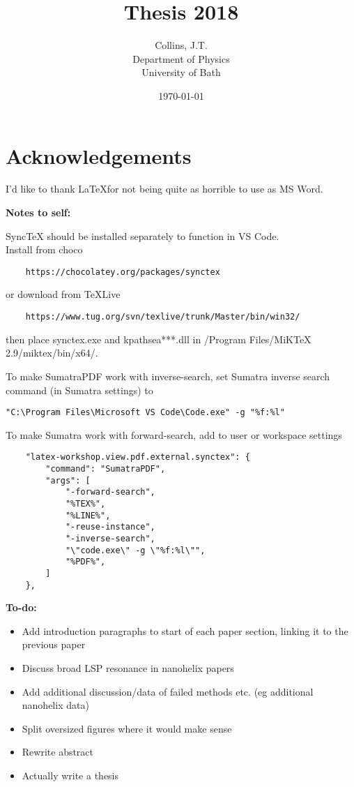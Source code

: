 \documentclass[11pt,a4paper,final]{report}
\title{Thesis 2018}
\author{
	Collins, J.T. \\ 
	Department of Physics\\
	University of Bath\\
}
\date{\today}
\begin{document}
\begin{titlepage}
    
\end{titlepage}


\begin{abstract}
    
\end{abstract}
\clearpage


\clearpage
\tableofcontents
\clearpage


\chapter*{Acknowledgements}

\color{red}
I'd like to thank \LaTeX  for not being quite as horrible to use as MS Word.

\noindent\textbf{Notes to self:}

\noindent SyncTeX should be installed separately to function in VS Code. \\
Install from choco
\begin{verbatim}
	https://chocolatey.org/packages/synctex
\end{verbatim}
or download from TeXLive 
\begin{verbatim}
	https://www.tug.org/svn/texlive/trunk/Master/bin/win32/
\end{verbatim}
then place synctex.exe and kpathsea***.dll in /Program Files/MiKTeX 2.9/miktex/bin/x64/.

\noindent To make SumatraPDF work with inverse-search, set Sumatra inverse search command (in Sumatra settings) to 
\begin{verbatim}
"C:\Program Files\Microsoft VS Code\Code.exe" -g "%f:%l"
\end{verbatim}

\noindent To make Sumatra work with forward-search, add to user or workspace settings
\begin{verbatim}
	"latex-workshop.view.pdf.external.synctex": {
		"command": "SumatraPDF",
		"args": [
			"-forward-search",
			"%TEX%",
			"%LINE%",
			"-reuse-instance",
			"-inverse-search",
			"\"code.exe\" -g \"%f:%l\"",
			"%PDF%",
		]
	},
\end{verbatim}

\clearpage

\noindent\textbf{To-do:}
\begin{itemize}
	\item Add introduction paragraphs to start of each paper section, linking it to the previous paper
	\item Discuss broad LSP resonance in nanohelix papers
	\item Add additional discussion/data of failed methods etc. (eg additional nanohelix data)
	\item Split oversized figures where it would make sense
	\item Rewrite abstract
    \item Actually write a thesis
\end{itemize}
\color{black}
\end{document}
